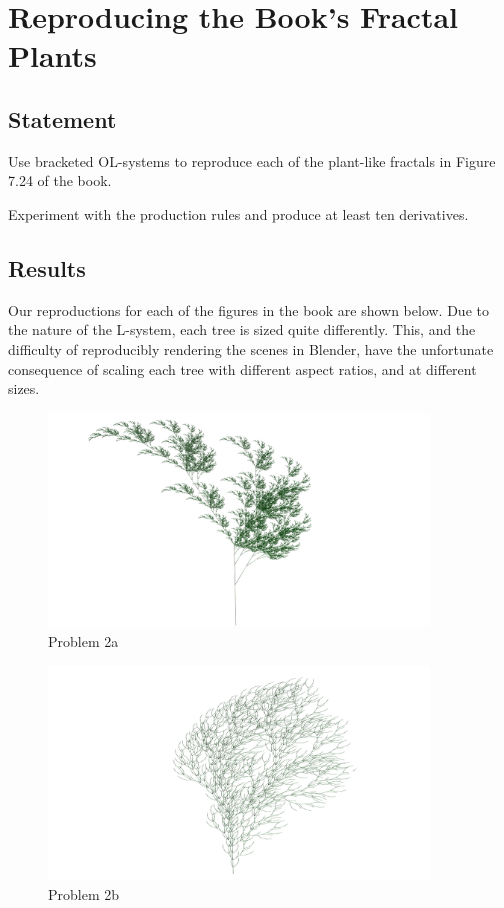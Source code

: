 \section{Reproducing the Book's Fractal Plants}

\subsection{Statement}
Use bracketed OL-systems to reproduce each of the plant-like fractals in Figure 7.24 of the book.

Experiment with the production rules and produce at least ten derivatives.

\subsection{Results}\label{sec:p2-results}
Our reproductions for each of the figures in the book are shown below.
Due to the nature of the L-system, each tree is sized quite differently.
This, and the difficulty of reproducibly rendering the scenes in Blender, have the unfortunate consequence of scaling each tree with different aspect ratios, and at different sizes.

\begin{figure}[H]
    \centering
    \includegraphics[width=0.90\textwidth]{figures/L-systems/a.png}
    \caption{Problem 2a}\label{fig:prob2a}
\end{figure}

\begin{figure}[H]
    \centering
    \includegraphics[width=0.90\textwidth]{figures/L-systems/b.png}
    \caption{Problem 2b}\label{fig:prob2b}
\end{figure}

